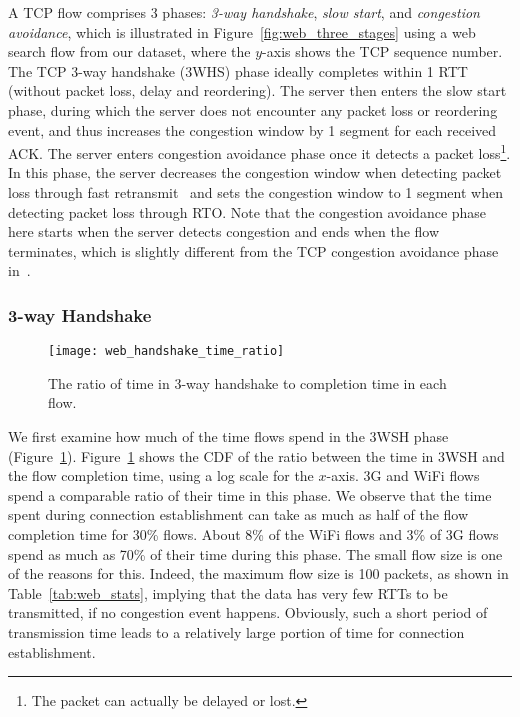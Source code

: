 A TCP flow comprises 3 phases: \emph{3-way handshake}, \emph{slow start}, and \emph{congestion avoidance}, which is illustrated in Figure~\ref{fig:web_three_stages} using a web search flow from our dataset, where the $y$-axis shows the TCP sequence number. The TCP 3-way handshake (3WHS) phase ideally completes within 1 RTT (\ie without packet loss, delay and reordering). The server then enters the slow start phase, during which the server does not encounter any packet loss or reordering event, and thus increases the congestion window by 1 segment for each received ACK. The server enters congestion avoidance phase once it detects a packet loss\footnote{The packet can actually be delayed or lost.}. In this phase, the server decreases the congestion window when detecting packet loss through fast retransmit~\cite{rfc6675} and sets the congestion window to 1 segment when detecting packet loss through RTO. Note that the congestion avoidance phase here starts when the server detects congestion and ends when the flow terminates, which is slightly different from the TCP congestion avoidance phase in~\cite{jacobson1988congestion}.


\subsubsection{3-way Handshake}

\begin{figure}[th]
\centering
\texttt{[image: web\_handshake\_time\_ratio]}
\caption{The ratio of time in 3-way handshake to completion time in each flow.}
\label{fig:web_handshake_ratio}
\minsqueeze
\end{figure}

We first examine how much of the time flows spend in the 3WSH phase (Figure~\ref{fig:web_handshake_ratio}). Figure~\ref{fig:web_handshake_ratio} shows the CDF of the ratio between the time in 3WSH and the flow completion time, using a log scale for the $x$-axis. 3G and WiFi flows spend a comparable ratio of their time in this phase. We observe that the time spent during connection establishment can take as much as half of the flow completion time for 30\% flows. About 8\% of the WiFi flows and 3\% of 3G flows spend as much as 70\% of their time during this phase. The small flow size is one of the reasons for this. Indeed, the maximum flow size is 100 packets, as shown in Table~\ref{tab:web_stats}, implying that the data has very few RTTs to be transmitted, if no congestion event happens. Obviously, such a short period of transmission time leads to a relatively large portion of time for connection establishment.


